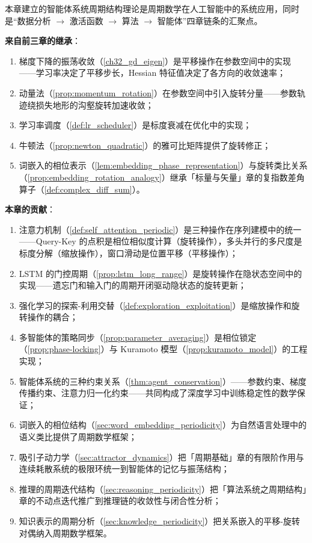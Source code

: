 \begin{remark}[与全书的统一]\label{rem:agent_chapter_unity}
本章建立的智能体系统周期结构理论是周期数学在人工智能中的系统应用，同时是“数据分析 $\to$ 激活函数 $\to$ 算法 $\to$ 智能体”四章链条的汇聚点。

\textbf{来自前三章的继承}：
\begin{enumerate}[label=(\roman*)]
    \item 梯度下降的振荡收敛（\cref{ch32_gd_eigen}）是平移操作在参数空间中的实现——学习率决定了平移步长，Hessian 特征值决定了各方向的收敛速率；
    \item 动量法（\cref{prop:momentum_rotation}）在参数空间中引入旋转分量——参数轨迹绕损失地形的沟壑旋转加速收敛；
    \item 学习率调度（\cref{def:lr_scheduler}）是标度衰减在优化中的实现；
    \item 牛顿法（\cref{prop:newton_quadratic}）的雅可比矩阵提供了旋转修正；
    \item 词嵌入的相位表示（\cref{lem:embedding_phase_representation}）与旋转类比关系（\cref{prop:embedding_rotation_analogy}）继承「标量与矢量」章的复指数差角算子（\cref{def:complex_diff_sum}）。
\end{enumerate}

\textbf{本章的贡献}：
\begin{enumerate}[label=(\roman*)]
    \item 注意力机制（\cref{def:self_attention_periodic}）是三种操作在序列建模中的统一——Query-Key 的点积是相位相似度计算（旋转操作），多头并行的多尺度是标度分解（缩放操作），窗口滑动是位置平移（平移操作）；
    \item LSTM 的门控周期（\cref{prop:lstm_long_range}）是旋转操作在隐状态空间中的实现——遗忘门和输入门的周期开闭驱动隐状态的旋转更新；
    \item 强化学习的探索-利用交替（\cref{def:exploration_exploitation}）是缩放操作和旋转操作的耦合；
    \item 多智能体的策略同步（\cref{prop:parameter_averaging}）是相位锁定（\cref{prop:phase-locking}）与 Kuramoto 模型（\cref{prop:kuramoto_model}）的工程实现；
    \item 智能体系统的三种约束关系（\cref{thm:agent_conservation}）——参数约束、梯度传播约束、注意力归一化约束——共同构成了深度学习中训练稳定性的数学保证；
    \item 词嵌入的相位结构（\cref{sec:word_embedding_periodicity}）为自然语言处理中的语义类比提供了周期数学框架；
    \item 吸引子动力学（\cref{sec:attractor_dynamics}）把「周期基础」章的有限阶作用与连续耗散系统的极限环统一到智能体的记忆与振荡结构；
    \item 推理的周期迭代结构（\cref{sec:reasoning_periodicity}）把「算法系统之周期结构」章的不动点迭代推广到推理链的收敛性与闭合性分析；
    \item 知识表示的周期分析（\cref{sec:knowledge_periodicity}）把关系嵌入的平移-旋转对偶纳入周期数学框架。
\end{enumerate}


\end{remark}

